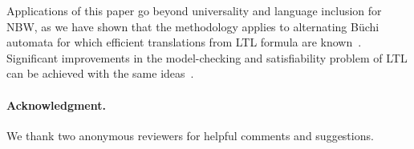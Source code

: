 \documentclass{LMCS}
\begin{document}
Applications of this paper go beyond universality and language inclusion 
for NBW, as we have shown that the methodology applies to alternating 
B\"uchi automata for which efficient translations from LTL formula are 
known~\cite{GastinOddoux}. Significant improvements in the model-checking 
and satisfiability problem of LTL can be achieved with the same ideas~\cite{DDMR08a,DDMR08c}.


\paragraph{{\bf Acknowledgment.}} We thank two anonymous reviewers for helpful 
comments and suggestions.






\end{document}
